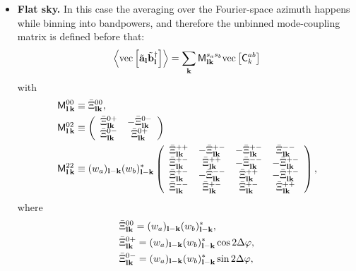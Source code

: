 \documentclass[a4paper,11pt]{article}
\begin{document}
\begin{itemize}
      \item {\bf Flat sky.} In this case the averaging over the Fourier-space azimuth happens while binning into bandpowers, and therefore the unbinned mode-coupling matrix is defined before that:
      \begin{equation}
        \left\langle{\rm vec}\left[\tilde{\bf a}_{\bf l}\tilde{\bf b}^\dag_{\bf l}\right]\right\rangle=\sum_{\bf k}{\sf M}^{s_as_b}_{{\bf l}{\bf k}}{\rm vec}\left[{\sf C}^{ab}_k\right]
      \end{equation}
      with
      \begin{align}
        {\sf M}^{00}_{{\bf l}\,{\bf k}}&\equiv \bar{\Xi}^{00}_{{\bf l}{\bf k}},\\\label{eq:m02_flat}
        {\sf M}^{02}_{{\bf l}\,{\bf k}}&\equiv 
        \left(
        \begin{array}{cc}
         \bar{\Xi}^{0+}_{{\bf l}{\bf k}} & -\bar{\Xi}^{0-}_{{\bf l}{\bf k}} \\
         \bar{\Xi}^{0-}_{{\bf l}{\bf k}} &  \bar{\Xi}^{0+}_{{\bf l}{\bf k}}
        \end{array}\right)\\\label{eq:m22_flat}
        {\sf M}^{22}_{{\bf l}\,{\bf k}}&\equiv (w_a)_{{\bf l}-{\bf k}}(w_b)^*_{{\bf l}-{\bf k}}\left(
        \begin{array}{cccc}
         \bar{\Xi}^{++}_{{\bf l}{\bf k}} & -\bar{\Xi}^{+-}_{{\bf l}{\bf k}} & -\bar{\Xi}^{+-}_{{\bf l}{\bf k}} &  \bar{\Xi}^{--}_{{\bf l}{\bf k}} \\
         \bar{\Xi}^{+-}_{{\bf l}{\bf k}} &  \bar{\Xi}^{++}_{{\bf l}{\bf k}} & -\bar{\Xi}^{--}_{{\bf l}{\bf k}} & -\bar{\Xi}^{+-}_{{\bf l}{\bf k}} \\
         \bar{\Xi}^{+-}_{{\bf l}{\bf k}} & -\bar{\Xi}^{--}_{{\bf l}{\bf k}} &  \bar{\Xi}^{++}_{{\bf l}{\bf k}} & -\bar{\Xi}^{+-}_{{\bf l}{\bf k}} \\
         \bar{\Xi}^{--}_{{\bf l}{\bf k}} &  \bar{\Xi}^{+-}_{{\bf l}{\bf k}} &  \bar{\Xi}^{+-}_{{\bf l}{\bf k}} & \bar{\Xi}^{++}_{{\bf l}{\bf k}}
        \end{array}\right),
      \end{align}
      where
      \begin{align}
        &\bar{\Xi}^{00}_{{\bf l}{\bf k}}=(w_a)_{{\bf l}-{\bf k}}(w_b)^*_{{\bf l}-{\bf k}},\\
        &\bar{\Xi}^{0+}_{{\bf l}{\bf k}}=(w_a)_{{\bf l}-{\bf k}}(w_b)^*_{{\bf l}-{\bf k}}\cos2\Delta\varphi,\\
        &\bar{\Xi}^{0-}_{{\bf l}{\bf k}}=(w_a)_{{\bf l}-{\bf k}}(w_b)^*_{{\bf l}-{\bf k}}\sin2\Delta\varphi,\\

\end{align}
\end{itemize}
\end{document}
